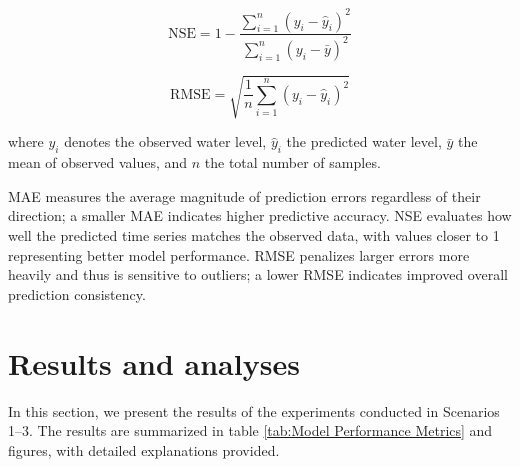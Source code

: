 \documentclass[a4paper,twoside,flushend, 10pt]{article}
\begin{document}
\begin{equation}
\text{NSE} = 1 - \frac{\sum_{i=1}^{n} (y_i - \hat{y}_i)^2}{\sum_{i=1}^{n} (y_i - \bar{y})^2}
\label{eq:nse}
\end{equation}

\begin{equation}
\text{RMSE} = \sqrt{\frac{1}{n} \sum_{i=1}^{n} (y_i - \hat{y}_i)^2}
\label{eq:rmse}
\end{equation}

where $y_i$ denotes the observed water level, $\hat{y}_i$ the predicted water level, $\bar{y}$ the mean of observed values, and $n$ the total number of samples.

MAE measures the average magnitude of prediction errors regardless of their direction; a smaller MAE indicates higher predictive accuracy.  
NSE evaluates how well the predicted time series matches the observed data, with values closer to 1 representing better model performance.  
RMSE penalizes larger errors more heavily and thus is sensitive to outliers; a lower RMSE indicates improved overall prediction consistency.

\section{Results and analyses}

In this section, we present the results of the experiments conducted in Scenarios 1--3. The results are summarized in table \ref{tab:Model Performance Metrics} and figures, with detailed explanations provided.
\end{document}
